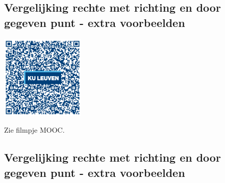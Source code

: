 \subsection{Vergelijking rechte met richting en door gegeven punt - extra voorbeelden}
\begin{minipage}{.25\linewidth}
	\raggedright
	\includegraphics[width=4cm]{4_opp_inhoud_an_meetk/inputs/QR_Code_VGLRECHTEVB_module4new}
\end{minipage}
\begin{minipage}{.7\linewidth}
	Zie filmpje MOOC.
\end{minipage}

\subsection{Vergelijking rechte met richting en door gegeven punt - extra voorbeelden}

